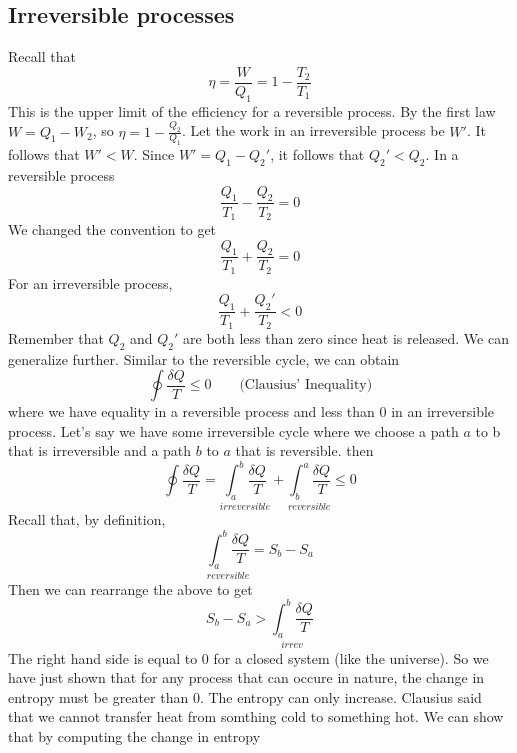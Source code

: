 \documentclass{report}
\numberwithin{equation}{section}
\begin{document}
\subsection{Irreversible processes}
Recall that 
\begin{equation*}
    \eta = \frac{W}{Q_1} = 1 - \frac{T_2}{T_1}
\end{equation*}
This is the upper limit of the efficiency for a reversible process. By the first law $W = Q_1 - W_2$, so $\eta = 1 - \frac{Q_2}{Q_1}$. Let the work in an irreversible process be $W'$. It follows that $W'<W$. Since $W' = Q_1 - Q_2'$, it follows that $Q_2'<Q_2$. 
In a reversible process
\begin{equation*}
    \frac{Q_1}{T_1} - \frac{Q_2}{T_2} = 0
\end{equation*}
We changed the convention to get 
\begin{equation*}
    \frac{Q_1}{T_1} + \frac{Q_2}{T_2} = 0
\end{equation*}
For an irreversible process, 
\begin{equation}
    \frac{Q_1}{T_1} + \frac{Q_2'}{T_2} < 0
\end{equation}
Remember that $Q_2$ and $Q_2'$ are both less than zero since heat is released. We can generalize further. Similar to the reversible cycle, we can obtain 
\begin{equation*}
    \oint \frac{\delta Q}{T} \leq 0 \qquad \text{(Clausius' Inequality)}
\end{equation*}
where we have equality in a reversible process and less than $0$ in an irreversible process. Let's say we have some irreversible cycle where we choose a path $a$ to b that is irreversible and a path $b$ to $a$ that is reversible. then 
\begin{equation*}
    \oint \frac{\delta Q}{T}=\underset{irreversible}{\int^b_a \frac{\delta Q}{T}} + \underset{reversible}{\int^a_b\frac{\delta Q}{T}} \leq 0
\end{equation*}
Recall that, by definition, 
\begin{equation*}
    \underset{reversible}{\int^b_a\frac{\delta Q}{T}} = S_b - S_a
\end{equation*}
Then we can rearrange the above to get
\begin{equation}
    S_b - S_a > \underset{irrev}{\int^b_a\frac{\delta Q}{T}}
\end{equation}
The right hand side is equal to $0$ for a closed system (like the universe). So we have just shown that for any process that can occure in nature, the change in entropy must be greater than $0$. The entropy can only increase. Clausius said that we cannot transfer heat from somthing cold to something hot. We can show that by computing the change in entropy 
\end{document}
